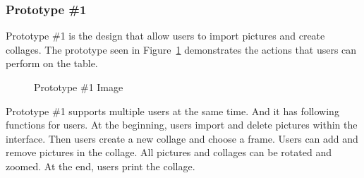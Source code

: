 \documentclass{tei2013}
\begin{document}
\subsubsection{Prototype \#1}
Prototype \#1 is the design that allow users to import pictures and create collages. The prototype seen in Figure~\ref{fig:prot1} demonstrates the actions that users can perform on the table. 
\begin{figure}[h]
\centering
{}
\caption{Prototype \#1 Image}
\label{fig:prot1}
\end{figure}

Prototype \#1 supports multiple users at the same time. And it has following functions for users. At the beginning, users import and delete pictures within the interface. Then users create a new collage and choose a frame. Users can add and remove pictures in the collage. All pictures and collages can be rotated and zoomed. At the end, users print the collage.
\end{document}
